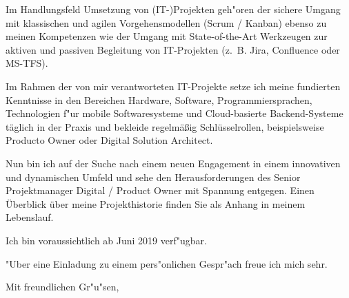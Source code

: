 \documentclass[11pt,a4paper]{dinbrief}
\begin{document}
\begin{letter}
Im Handlungsfeld Umsetzung von (IT-)Projekten geh"oren der sichere Umgang mit klassischen und agilen Vorgehensmodellen (Scrum / Kanban) ebenso zu meinen Kompetenzen wie der Umgang mit State-of-the-Art Werkzeugen zur aktiven und passiven Begleitung von IT-Projekten (z.~B. Jira, Confluence oder MS-TFS). 

Im Rahmen der von mir verantworteten IT-Projekte setze ich meine fundierten Kenntnisse in den Bereichen Hardware, Software, Programmiersprachen, Technologien f"ur mobile Softwaresysteme und Cloud-basierte Backend-Systeme täglich in der Praxis und bekleide regelmäßig Schlüsselrollen, beispielsweise Producto Owner oder Digital Solution Architect.


Nun bin ich auf der Suche nach einem neuen Engagement in einem innovativen und dynamischen Umfeld und sehe den Herausforderungen des Senior Projektmanager Digital / Product Owner mit Spannung entgegen. Einen Überblick über meine Projekthistorie finden Sie als Anhang in meinem Lebenslauf.


Ich bin voraussichtlich ab Juni 2019 verf"ugbar.

"Uber eine Einladung zu einem pers"onlichen Gespr"ach freue ich mich sehr.

\closing{Mit freundlichen Gr"u"sen,}
\end{letter}
\end{document}
